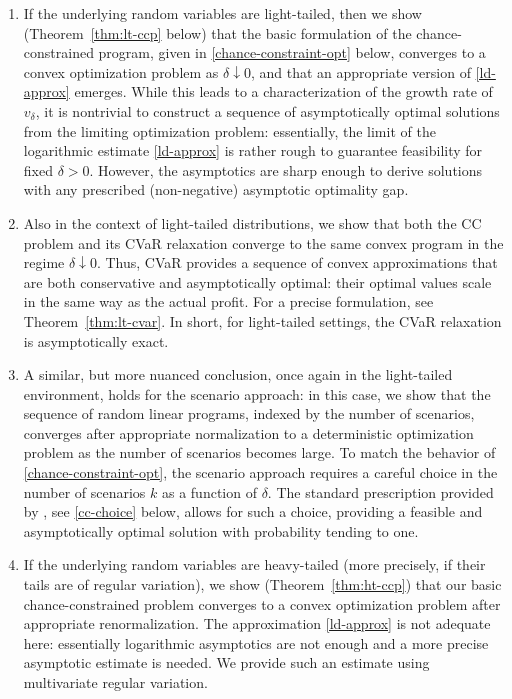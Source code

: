 \documentclass[a4paper, a4wide, 10pt, reqno]{amsart}
\theoremstyle{plain}
\begin{document}
\begin{enumerate}[leftmargin=17pt]
    \item If the underlying random variables are light-tailed, then we show (Theorem~\ref{thm:lt-ccp} below) that the basic formulation of the chance-constrained program, given in \eqref{chance-constraint-opt} below, 
    converges to a convex optimization problem as $\delta\downarrow 0$, and that an appropriate version of \eqref{ld-approx} emerges. While this leads to a characterization of the growth rate of $v_\delta$, it is nontrivial to construct a sequence of asymptotically optimal solutions from the limiting optimization problem: essentially, the limit of the logarithmic estimate \eqref{ld-approx} is rather rough to guarantee feasibility for fixed $\delta>0$. However, the asymptotics are sharp enough to derive solutions with any prescribed (non-negative) asymptotic optimality gap. 
    \item Also in the context of light-tailed distributions, we show that both the CC problem and its CVaR relaxation converge to the same convex program in the regime $\delta\downarrow 0$. Thus, CVaR provides a sequence of convex approximations that are both conservative and asymptotically optimal: their optimal values scale in the same way as the actual profit. For a precise formulation, see Theorem~\ref{thm:lt-cvar}. In short, for light-tailed settings, the CVaR relaxation is asymptotically exact.
    \item  A similar, but more nuanced conclusion, once again in the light-tailed environment, holds for the scenario approach: in this case, we show that the sequence of random linear programs, indexed by the number of scenarios, converges after appropriate normalization to a deterministic optimization problem as the number of scenarios becomes large. To match the behavior of \eqref{chance-constraint-opt}, the scenario approach requires a careful choice in the number of scenarios $k$ as a function of $\delta$. The standard prescription provided by \cite{calafiore2006scenario}, see \eqref{cc-choice} below, allows for such a choice, providing a feasible and asymptotically optimal solution with probability tending to one.  

\item If the underlying random variables are heavy-tailed (more precisely, if their tails are of regular variation), we show (Theorem~\ref{thm:ht-ccp}) that our basic chance-constrained problem converges to a convex optimization problem after appropriate renormalization. The approximation \eqref{ld-approx} is not adequate here: essentially logarithmic asymptotics are not enough and a more precise asymptotic estimate is needed. We provide such an estimate  using multivariate regular variation.


\end{enumerate}
\end{document}
